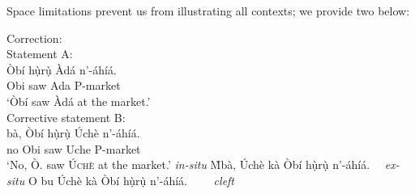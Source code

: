 \documentclass[output=paper,colorlinks,citecolor=brown]{langscibook}
\begin{document}
Space limitations prevent us from illustrating all contexts; we provide two below:



\ea%
    \label{ex:amaechi:9}
    Correction:\\\vspace*{-0.2cm}
    \ea\label{ex:amaechi:9a}
    Statement A:\\
    \gll    Òbí hụ̀rụ̀ Àdá n'-áhíá.\\
            Obi saw Ada P-market\\
    \glt    `Òbí saw {Àdá} at the market.'\\
    \ex\label{ex:amaechi:9b}
    Corrective statement B:\\
        \ea\label{ex:amaechi:9bi}
        bà, Òbí hụ̀rụ̀ Úchè n'-áhíá.\\
                no Obi saw Uche P-market\\
        \glt    `No, Ò. saw \textsc{Úchè} at the market.' \textit{in-situ}
        \ex\label{ex:amaechi:9bii}
                {\`M}bà, Úchè kà Òbí hụ̀rụ̀   n'-áhíá. ~~\textit{ex-situ}
        \ex\label{ex:amaechi:9biii}
                O bu Úchè kà Òbí hụ̀rụ̀   n'-áhíá. ~~~~\textit{cleft}
        \z
    \z
\z
\end{document}
